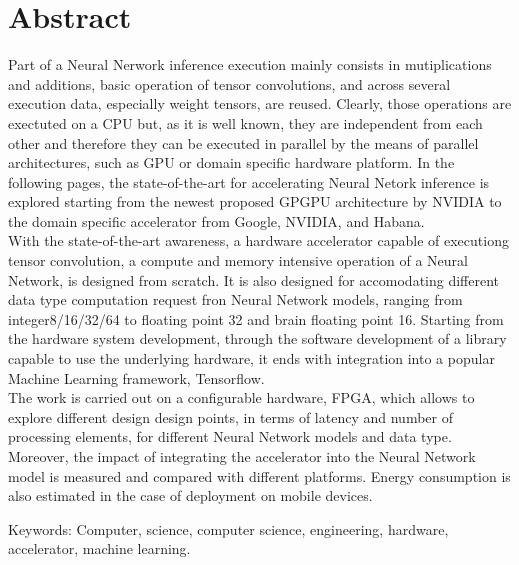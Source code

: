 
\thispagestyle{plain_cover}			%
\setlength{\parskip}{0pt plus 1.0pt}
\section*{Abstract}
Part of a Neural Nerwork inference execution mainly consists in mutiplications and additions, basic operation of tensor convolutions, and across several execution data, especially weight tensors, are reused.
Clearly,  those operations are exectuted on a CPU but, as it is well known,  they are independent from each other and therefore they can be executed in parallel by the means of parallel architectures, such as GPU or domain specific hardware platform.
In the following pages, the state-of-the-art for accelerating Neural Netork inference is explored starting from the newest proposed GPGPU architecture by NVIDIA to the domain specific accelerator from Google, NVIDIA, and Habana.\\
With the state-of-the-art awareness, a hardware accelerator capable of executiong tensor convolution, a compute and memory intensive operation of a Neural Network, is designed from scratch. It is also designed for accomodating different data type computation request fron Neural Network models, ranging from integer8/16/32/64 to floating point 32 and brain floating point 16.
Starting from the hardware system development, through the software development of a library capable to use the underlying hardware, it ends with integration into a popular Machine Learning framework, Tensorflow.\\
The work is carried out on a configurable hardware, FPGA, which allows to explore different design design points, in terms of latency and number of processing elements,  for different Neural Network models and data type. Moreover, the impact of integrating the accelerator into the Neural Network model is measured and compared with different platforms. Energy consumption is also estimated in the case of deployment on mobile devices.


\vfill
Keywords: Computer, science, computer science, engineering, hardware, accelerator, machine learning.

\newpage				%
\thispagestyle{empty}
\mbox{}